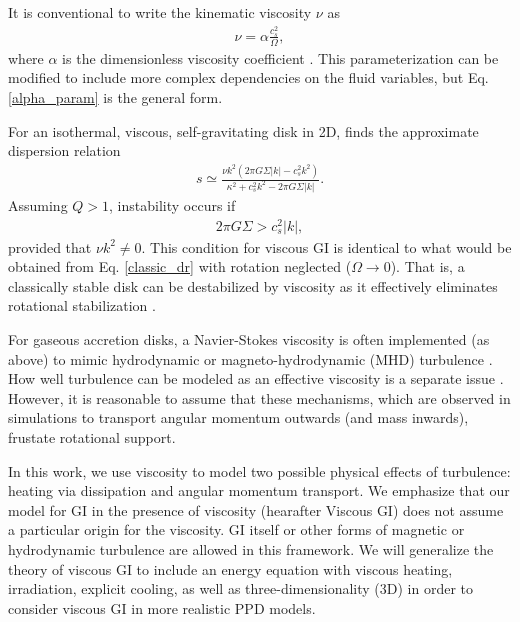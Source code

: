 \documentclass[iop, numberedappendix]{emulateapj}
\begin{document}
It is conventional to write the kinematic viscosity $\nu$ as   
\begin{align}\label{alpha_param}
  \nu  = \alpha \frac{c_s^2}{\Omega}, %
\end{align}
where $\alpha$ is the dimensionless viscosity
coefficient \cite{shakura73}. This
parameterization can be modified to include more complex dependencies on the
fluid variables, but Eq. \ref{alpha_param} is the general form. 

For an isothermal, viscous, self-gravitating disk in 2D,
\cite{gammie96} finds the approximate dispersion relation   
\begin{align}
s \simeq \frac{\nu k^2\left(2\pi G\Sigma |k| -
  c_s^2k^2\right)}{\kappa^2 + c_s^2k^2 - 2\pi G\Sigma|k|}. 
\end{align}
Assuming $Q>1$, instability occurs if 
\begin{align*}
  2\pi G \Sigma > c_s^2|k|,
\end{align*}
provided that $\nu k^2\neq0$. This condition for viscous GI is 
identical to what would be obtained from Eq. \ref{classic_dr} with
rotation neglected ($\Omega\to 0$). That is, a classically stable
disk can be destabilized by viscosity as it effectively eliminates
rotational stabilization \citep{lynden-bell74}.  

For gaseous accretion disks, a Navier-Stokes viscosity is often
implemented (as above) to mimic hydrodynamic or magneto-hydrodynamic
(MHD) turbulence \citep{shakura73}. How well turbulence can be modeled
as an effective viscosity is a separate issue 
\citep{balbus99}. However, it is reasonable to assume that these mechanisms, which are observed in simulations 
to transport angular momentum outwards (and mass inwards),
frustate rotational support. %

In this work, we use viscosity to model two possible
physical effects of turbulence: heating via dissipation and angular momentum transport. 
We emphasize that our model for GI in the presence of viscosity (hearafter Viscous GI)
does not assume a particular origin for the viscosity. GI itself or other forms of magnetic or hydrodynamic turbulence are allowed
in this framework. We will
generalize the theory of viscous GI to include an energy equation  with viscous
heating, irradiation, explicit cooling, as well as
three-dimensionality (3D) in order to consider viscous GI in
more realistic PPD models.  
\end{document}
